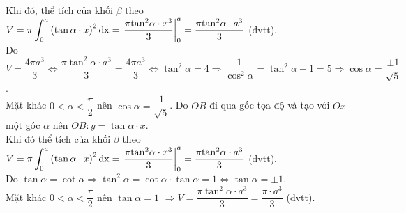 \begin{ex}
{\begin{itemchoice}
			Khi đó, thể tích của khối $\beta $ theo $V=\pi\displaystyle\int_0^a{\left(\tan\alpha  \cdot x\right)^2\rm{d}x}=\left.\dfrac{\pi{\tan^2}\alpha \cdot x^3}{3}\right|_0^a=\dfrac{\pi{\tan^2}\alpha\cdot a^3}{3}$ (đvtt).\\
			Do $V=\dfrac{4\pi{a^3}}{3}\Leftrightarrow\dfrac{\pi{\tan^2}\alpha  \cdot a^3}{3}=\dfrac{4\pi{a^3}}{3}\Leftrightarrow{\tan ^2}\alpha=4\Rightarrow\dfrac{1}{\cos^2\alpha}=\tan ^2\alpha+1=5\Rightarrow\cos\alpha=\dfrac{\pm 1}{\sqrt 5}$.\\
			Mặt khác $0  <\alpha <\dfrac{\pi}{2}$ nên $\cos\alpha=\dfrac{1}{\sqrt 5}$.
			\itemch Do $OB$ đi qua gốc tọa độ và  tạo với $Ox$ một góc $\alpha $ nên $OB\colon y=\tan\alpha\cdot x$.\\
			Khi đó thể tích của khối $\beta $  theo $V=\pi\displaystyle\int_0^a{\left(\tan\alpha \cdot x\right)^2\rm{d}x}=\left.\dfrac{\pi{\tan^2}\alpha \cdot x^3}{3}\right|_0^a=\dfrac{\pi{\tan^2}\alpha\cdot a^3}{3}$ (đvtt).\\
			Do $\tan\alpha=\cot\alpha\Rightarrow{\tan ^2}\alpha=\cot\alpha \cdot\tan\alpha=1\Leftrightarrow\tan\alpha=\pm 1$.\\ 
			Mặt khác $0 <\alpha <\dfrac{\pi}{2}$ nên $\tan\alpha=1$ $\Rightarrow V=\dfrac{\pi{\tan^2}\alpha \cdot a^3}{3}=\dfrac{\pi  \cdot a^3}{3}$ (đvtt).
		\end{itemchoice}
	 }
\end{ex}


